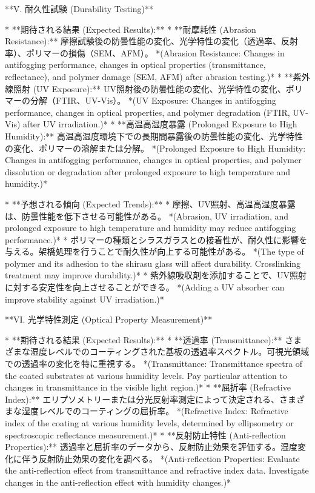 \documentclass{article}
\begin{document}
**V. 耐久性試験 (Durability Testing)**

*   **期待される結果 (Expected Results):**
    *   **耐摩耗性 (Abrasion Resistance):** 摩擦試験後の防曇性能の変化、光学特性の変化（透過率、反射率）、ポリマーの損傷（SEM、AFM）。
        *(Abrasion Resistance: Changes in antifogging performance, changes in optical properties (transmittance, reflectance), and polymer damage (SEM, AFM) after abrasion testing.)*
    *   **紫外線照射 (UV Exposure):** UV照射後の防曇性能の変化、光学特性の変化、ポリマーの分解（FTIR、UV-Vis）。
        *(UV Exposure: Changes in antifogging performance, changes in optical properties, and polymer degradation (FTIR, UV-Vis) after UV irradiation.)*
    *   **高温高湿度暴露 (Prolonged Exposure to High Humidity):** 高温高湿度環境下での長期間暴露後の防曇性能の変化、光学特性の変化、ポリマーの溶解または分解。
        *(Prolonged Exposure to High Humidity: Changes in antifogging performance, changes in optical properties, and polymer dissolution or degradation after prolonged exposure to high temperature and humidity.)*

*   **予想される傾向 (Expected Trends):**
    *   摩擦、UV照射、高温高湿度暴露は、防曇性能を低下させる可能性がある。
        *(Abrasion, UV irradiation, and prolonged exposure to high temperature and humidity may reduce antifogging performance.)*
    *   ポリマーの種類とシラスガラスとの接着性が、耐久性に影響を与える。架橋処理を行うことで耐久性が向上する可能性がある。
        *(The type of polymer and its adhesion to the shirasu glass will affect durability. Crosslinking treatment may improve durability.)*
    *   紫外線吸収剤を添加することで、UV照射に対する安定性を向上させることができる。
        *(Adding a UV absorber can improve stability against UV irradiation.)*

**VI. 光学特性測定 (Optical Property Measurement)**

*   **期待される結果 (Expected Results):**
    *   **透過率 (Transmittance):** さまざまな湿度レベルでのコーティングされた基板の透過率スペクトル。可視光領域での透過率の変化を特に重視する。
        *(Transmittance: Transmittance spectra of the coated substrates at various humidity levels. Pay particular attention to changes in transmittance in the visible light region.)*
    *   **屈折率 (Refractive Index):** エリプソメトリーまたは分光反射率測定によって決定される、さまざまな湿度レベルでのコーティングの屈折率。
        *(Refractive Index: Refractive index of the coating at various humidity levels, determined by ellipsometry or spectroscopic reflectance measurement.)*
    *   **反射防止特性 (Anti-reflection Properties):** 透過率と屈折率のデータから、反射防止効果を評価する。湿度変化に伴う反射防止効果の変化を調べる。
        *(Anti-reflection Properties: Evaluate the anti-reflection effect from transmittance and refractive index data. Investigate changes in the anti-reflection effect with humidity changes.)*
\end{document}
